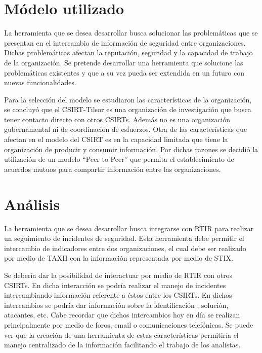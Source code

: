 \documentclass[11pt]{article}
\begin{document}
\bigskip

\section[Modelo utilizado]{Módelo utilizado}

\bigskip

La herramienta que se desea desarrollar busca solucionar las problemáticas que se presentan en el intercambio de
información de seguridad entre organizaciones. Dichas problemáticas afectan la reputación, seguridad y la capacidad de
trabajo de la organización. Se pretende desarrollar una herramienta que solucione las problemáticas existentes y que a
su vez pueda ser extendida en un futuro con nuevas funcionalidades.


\bigskip

Para la selección del modelo se estudiaron las características de la organización, se concluyó que el CSIRT-Tilsor es
una organización de investigación que busca tener contacto directo con otros CSIRTs. Además no es una organización
gubernamental ni de coordinación de esfuerzos. Otra de las características que afectan en el modelo del CSIRT es en la
capacidad limitada que tiene la organización de producir y consumir información. Por dichas razones se decidió la
utilización de un modelo ``Peer to Peer'' que permita el establecimiento de acuerdos mutuos para compartir información
entre las organizaciones.

\section{Análisis}

\bigskip

La herramienta que se desea desarrollar busca integrarse con RTIR para realizar un seguimiento de incidentes de
seguridad. Esta herramienta debe permitir el intercambio de indicadores entre dos organizaciones, el cual debe ser
realizado por medio de TAXII con la información representada por medio de STIX. 


\bigskip

Se debería dar la posibilidad de interactuar por medio de RTIR con otros CSIRTs. En dicha interacción se podría realizar
el manejo de incidentes intercambiando información referente a éstos entre los CSIRTs. En dichos intercambios se podría
dar información sobre la identificación , solución, atacantes, etc. Cabe recordar que dichos intercambios hoy en día se
realizan principalmente por medio de foros, email o comunicaciones telefónicas. Se puede ver que la creación de una
herramienta de estas características permitiría el manejo centralizado de la información facilitando el trabajo de los
analistas.
\end{document}
